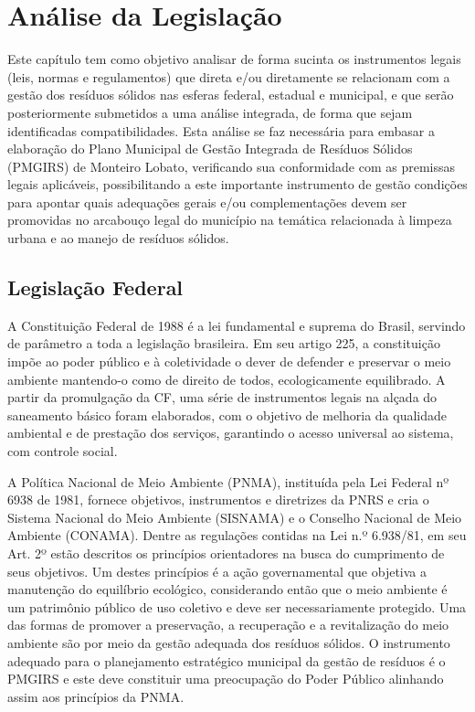 	\thispagestyle{headfootimage}
	\section{Análise da Legislação}
	Este capítulo tem como objetivo analisar de forma sucinta os instrumentos legais (leis, normas e regulamentos) que direta e/ou diretamente se relacionam com a gestão dos resíduos sólidos nas esferas federal, estadual e municipal, e que serão posteriormente submetidos a uma análise integrada, de forma que sejam identificadas compatibilidades. Esta análise se faz necessária para embasar a elaboração do Plano Municipal de Gestão Integrada de Resíduos Sólidos (PMGIRS) de Monteiro Lobato, verificando sua conformidade com as premissas legais aplicáveis, possibilitando a este importante instrumento de gestão condições para apontar quais adequações gerais e/ou complementações devem ser promovidas no arcabouço legal do município na temática relacionada à limpeza urbana e ao manejo de resíduos sólidos.
	
	\subsection{Legislação Federal}
	A Constituição Federal de 1988 é a lei fundamental e suprema do Brasil, servindo de parâmetro a toda a legislação brasileira. Em seu artigo 225, a constituição impõe ao poder público e à coletividade o dever de defender e preservar o meio ambiente mantendo-o como de direito de todos, ecologicamente equilibrado. A partir da promulgação da CF, uma série de instrumentos legais na alçada do saneamento básico foram elaborados, com o objetivo de melhoria da qualidade ambiental e de prestação dos serviços, garantindo o acesso universal ao sistema, com controle social.
	
	A Política Nacional de Meio Ambiente (PNMA), instituída pela Lei Federal nº 6938 de 1981, fornece objetivos, instrumentos e diretrizes da PNRS e cria o Sistema Nacional do Meio Ambiente (SISNAMA) e o Conselho Nacional de Meio Ambiente (CONAMA). Dentre as regulações contidas na Lei n.º 6.938/81, em seu Art. 2º estão descritos os princípios orientadores na busca do cumprimento de seus objetivos. Um destes princípios é a ação governamental que objetiva a manutenção do equilíbrio ecológico, considerando então que o meio ambiente é um patrimônio público de uso coletivo e deve ser necessariamente protegido. Uma das formas de promover a preservação, a recuperação e a revitalização do meio ambiente são por meio da gestão adequada dos resíduos sólidos. O instrumento adequado para o planejamento estratégico municipal da gestão de resíduos é o PMGIRS e este deve constituir uma preocupação do Poder Público alinhando assim aos princípios da PNMA.
	
